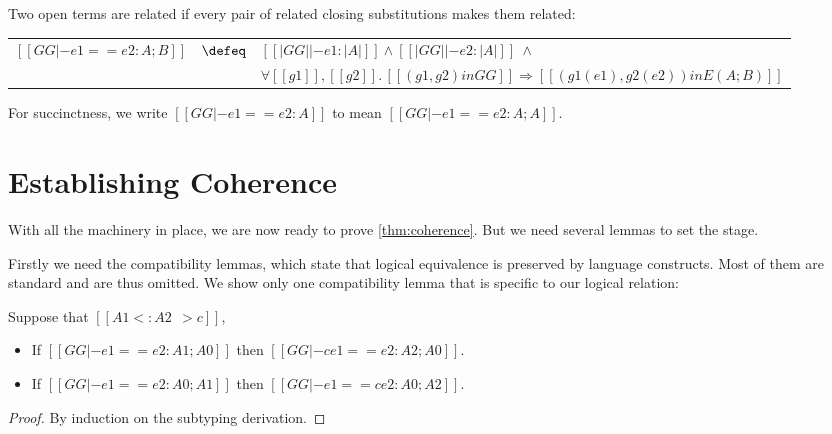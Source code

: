 \begin{definition}
\end{definition}

Two open terms are related if every pair of related closing substitutions
makes them related:
\begin{definition} \leavevmode
  \begin{center}
  \begin{tabular}{lll}
    $[[GG |- e1 == e2 : A ; B]] $ & $\defeq $ & $[[|GG| |- e1 : |A|]] \land [[|GG| |- e2 : | A | ]] \ \land $ \\
                                 & & $\forall [[g1]], [[g2]] .\, [[(g1, g2) in GG ]] \Longrightarrow [[(g1 (e1), g2 (e2))  in E (A ; B) ]]$
  \end{tabular}
  \end{center}
\end{definition}
For succinctness, we write $[[GG |- e1 == e2 : A]]$ to mean $[[GG |- e1 == e2 : A ; A]]$.


\section{Establishing Coherence}

With all the machinery in place, we are now ready to prove \cref{thm:coherence}.
But we need several lemmas to set the stage.

Firstly we need the compatibility lemmas, which state that logical equivalence is
preserved by language constructs. Most of them are standard and are thus omitted.
We show only one compatibility lemma that is specific to our logical relation:

\begin{lemma}   \label{lemma:co-compa}
  Suppose that $[[A1 <: A2 ~~> c]]$,
  \begin{itemize}
  \item If $[[GG |- e1 == e2 : A1 ; A0]]$ then $[[GG |- c e1 == e2 : A2 ; A0]]$.
  \item If $[[GG |- e1 == e2 : A0 ; A1]]$ then $[[GG |- e1 == c e2 : A0 ; A2]]$.
  \end{itemize}
\end{lemma}
\begin{proof}
  By induction on the subtyping derivation.
\end{proof}


